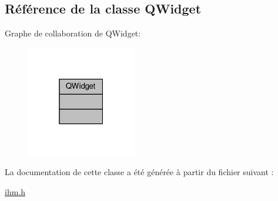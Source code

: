 \hypertarget{class_q_widget}{}\subsection{Référence de la classe Q\+Widget}
\label{class_q_widget}


Graphe de collaboration de Q\+Widget\+:
\nopagebreak
\begin{figure}[H]
\begin{center}
\leavevmode
\includegraphics[width=135pt]{class_q_widget__coll__graph}
\end{center}
\end{figure}


La documentation de cette classe a été générée à partir du fichier suivant \+:\begin{DoxyCompactItemize}
\item 
\hyperlink{ihm_8h}{ihm.\+h}\end{DoxyCompactItemize}
